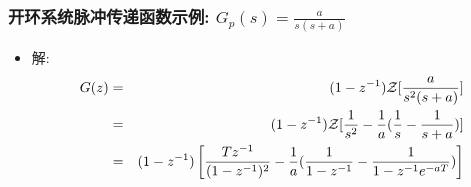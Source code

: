 \documentclass[table]{article}
\begin{document}
\begin{frame}
\frametitle{开环系统脉冲传递函数示例:  $G_p(s)=\frac{a}{s(s+a)}$}
\label{sec-4-3-4}

\begin{itemize}
\item <2->解:
      \begin{eqnarray*}
      G(z) & = &(1-z^{-1}){\cal Z}[\frac{a}{s^2(s+a)}] \\
       &=& (1-z^{-1}){\cal Z}[\frac{1}{s^2}-\frac{1}{a}(\frac{1}{s}-\frac{1}{s+a})] \\
       &=& (1-z^{-1})\left[\frac{Tz^{-1}}{(1-z^{-1})^2}-\frac{1}{a}(\frac{1}{1-z^{-1}}-\frac{1}{1-z^{-1}e^{-aT}} )\right]
      \end{eqnarray*}
\end{itemize}
\end{frame}
\end{document}
